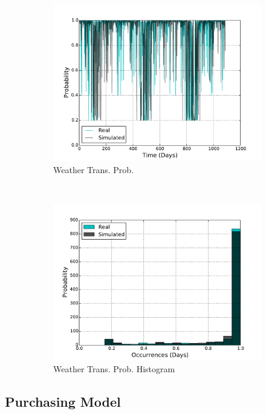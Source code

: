 \documentclass[11pt, letterpaper]{article}
\begin{document}
\begin{figure}[H]
\begin{subfigure}[b]{0.45\textwidth}
    \includegraphics[width=\textwidth]{figures/weather_trans_prob.pdf}
    \caption{Weather Trans. Prob.}
  \end{subfigure}
  ~
  \begin{subfigure}[b]{0.45\textwidth}
    \includegraphics[width=\textwidth]{figures/weather_trans_prob_hist.pdf}
    \caption{Weather Trans. Prob. Histogram}
  \end{subfigure}
  \label{fig:analysis}
  \caption{}
\end{figure}


\subsection{Purchasing Model}
\end{document}

